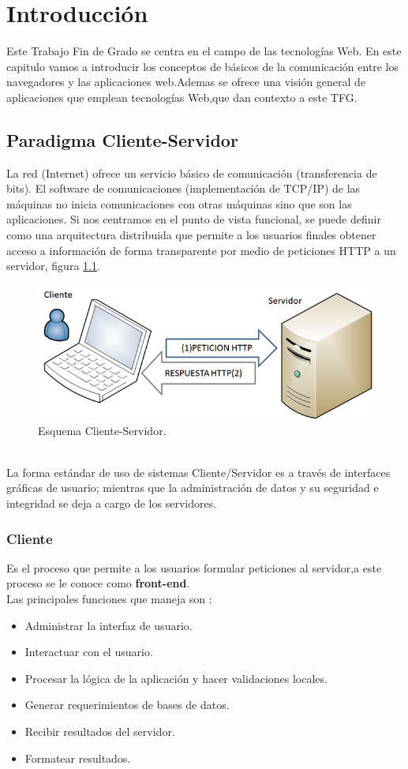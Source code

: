 \chapter{Introducción}
Este Trabajo Fin de Grado se centra en el campo de las tecnologías Web. En este capitulo vamos a introducir los conceptos de básicos de la comunicación entre los navegadores y las aplicaciones web.Ademas se ofrece una visión general de aplicaciones que emplean tecnologías Web,que dan contexto a este TFG.
\section{Paradigma Cliente-Servidor}
La red (Internet) ofrece un servicio básico de comunicación (transferencia de bits). El software de comunicaciones (implementación de TCP/IP) de las máquinas no inicia comunicaciones con otras máquinas sino que son las aplicaciones.
Si nos centramos en el punto de vista funcional, se puede definir como una arquitectura distribuida que permite a los usuarios finales obtener acceso a información de forma transparente por medio de peticiones HTTP a un servidor, figura \ref{fig:Cliente_Servidor}.
\begin{figure}[!h]
\centering
\includegraphics[width=0.5\linewidth]{Figures/Cliente_Servidor}
\decoRule
\caption[Esquema Cliente-Servidor]{Esquema Cliente-Servidor.}
\label{fig:Cliente_Servidor}
\end{figure}
\\La forma estándar de uso de sistemas Cliente/Servidor es a través de interfaces gráficas de usuario; mientras que la administración de datos y su seguridad e integridad se deja a cargo de los servidores.
\subsection*{Cliente}
Es el proceso que permite a los usuarios formular peticiones al servidor,a este proceso se le conoce como \textbf{front-end}.
\\Las principales funciones  que maneja son :
\begin{itemize}
\item Administrar la interfaz de usuario.
\item Interactuar con el usuario.
\item Procesar la lógica de la aplicación y hacer validaciones locales.
\item Generar requerimientos de bases de datos.
\item Recibir resultados del servidor.
\item Formatear resultados. 
\end{itemize}

